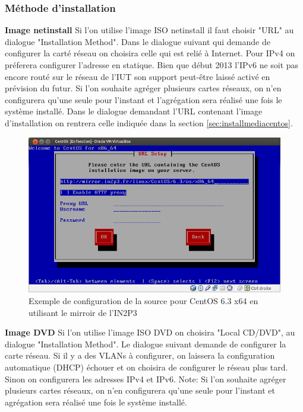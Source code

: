 \documentclass[a4paper,oneside]{report}
\begin{document}
\subsubsection{Méthode d'installation}
\textbf{Image netinstall}\newline
Si l'on utilise l'image ISO netinstall il faut choisir "URL" au dialogue "Installation Method".\newline
Dans le dialogue suivant qui demande de configurer la carté réseau on choisira celle qui est relié à Internet.
Pour IPv4 on préferera configurer l'adresse en statique.
Bien que début 2013 l'IPv6 ne soit pas encore routé sur le réseau de l'IUT son support peut-être laissé activé en prévision du futur.\newline
Si l'on souhaite agréger plusieurs cartes réseaux, on n'en configurera qu'une seule pour l'instant et l'agrégation sera réalisé une fois le système installé.\newline
Dans le dialogue demandant l'URL contenant l'image d'installation on rentrera celle indiquée dans la section \ref{sec:installmediacentos}.\newline
\begin{figure}[!h]
\centering
\includegraphics[resolution=110]{images/config_in2p3.png}
\caption{Exemple de configuration de la source pour CentOS 6.3 x64 en utilisant le mirroir de l'IN2P3}
\end{figure}

\textbf{Image DVD}\newline
Si l'on utilise l'image ISO DVD on choisira "Local CD/DVD", au dialogue "Installation Method".\newline
Le dialogue suivant demande de configurer la carte réseau.
Si il y a des VLANs à configurer, on laissera la configuration automatique (DHCP) échouer et on choisira de configurer le réseau plus tard.
Sinon on configurera les adresses IPv4 et IPv6.\newline
Note: Si l'on souhaite agréger plusieurs cartes réseaux, on n'en configurera qu'une seule pour l'instant et agrégation sera réalisé une fois le système installé.\newline
\end{document}
